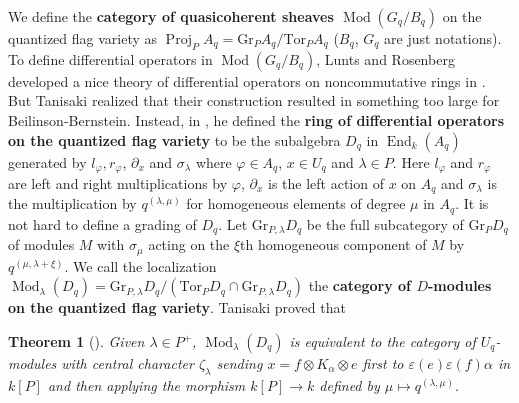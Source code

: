 \documentclass[11pt, a4paper]{article}
\newtheorem{theorem}{Theorem}[subsection]
\theoremstyle{definition}
\newcommand{\ve}[0]{\varepsilon}
\newcommand{\s}[0]{\sigma}
\newcommand{\Proj}[0]{\operatorname{Proj}}
\newcommand{\End}[0]{\operatorname{End}}
\newcommand{\Mod}{\operatorname{Mod}}
\begin{document}
    We define the \textbf{category of quasicoherent sheaves $\Mod(G_q/B_q)$} on the quantized flag variety as $\Proj_P A_q=\text{Gr}_P A_q/\text{Tor}_PA_q$ ($B_q$, $G_q$ are just notations). To define differential operators in $\Mod(G_q/B_q)$, Lunts and Rosenberg developed a nice theory of differential operators on noncommutative rings in \cite{MR1481133}. But Tanisaki realized that their construction resulted in something too large for Beilinson-Bernstein. Instead, in \cite{tanisaki-quantum}, he defined the \textbf{ring of differential operators on the quantized flag variety} to be the subalgebra $D_q$ in $\End_k(A_q)$ generated by $l_\varphi, r_\varphi$, $\partial_x$ and $\s_\lambda$ where $\varphi\in A_q$, $x\in U_q$ and $\lambda\in P$. Here $l_\varphi$ and $r_\varphi$ are left and right multiplications by $\varphi$, $\partial_x$ is the left action of $x$ on $A_q$ and $\s_\lambda$ is the multiplication by $q^{(\lambda, \mu)}$ for homogeneous elements of degree $\mu$ in $A_q$. It is not hard to define a grading of $D_q$. Let $\text{Gr}_{P,\lambda}D_q$ be the full subcategory of $\text{Gr}_P D_q$ of modules $M$ with $\s_\mu$ acting on the $\xi$th homogeneous component of $M$ by $q^{(\mu,\lambda+\xi)}$. We call the localization $\Mod_\lambda(D_q)=\text{Gr}_{P,\lambda}D_q/(\text{Tor}_PD_q\cap\text{Gr}_{P,\lambda}D_q)$ the \textbf{category of $D$-modules on the quantized flag variety}. Tanisaki proved that
    \begin{theorem}[\cite{tanisaki-quantum}]
        Given $\lambda\in P^+$, $\Mod_\lambda(D_q)$ is equivalent to the category of $U_q$-modules with central character $\zeta_\lambda$ sending $x=f\otimes K_\alpha\otimes e$ first to $\ve(e)\ve(f)\alpha$ in $k[P]$ and then applying the morphism $k[P]\to k$ defined by $\mu\mapsto q^{(\lambda,\mu)}$. 
    \end{theorem}
\end{document}
